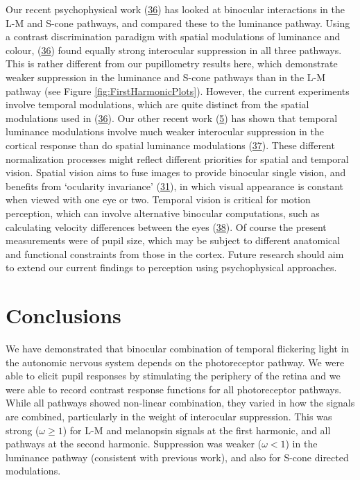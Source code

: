 \documentclass[
]{article}
\begin{document}
Our recent psychophysical work (\protect\hyperlink{ref-Baker2024}{36}) has looked at binocular interactions in the L-M and S-cone pathways, and compared these to the luminance pathway. Using a contrast discrimination paradigm with spatial modulations of luminance and colour, (\protect\hyperlink{ref-Baker2024}{36}) found equally strong interocular suppression in all three pathways. This is rather different from our pupillometry results here, which demonstrate weaker suppression in the luminance and S-cone pathways than in the L-M pathway (see Figure \ref{fig:FirstHarmonicPlots}). However, the current experiments involve temporal modulations, which are quite distinct from the spatial modulations used in (\protect\hyperlink{ref-Baker2024}{36}). Our other recent work (\protect\hyperlink{ref-Segala2023}{5}) has shown that temporal luminance modulations involve much weaker interocular suppression in the cortical response than do spatial luminance modulations (\protect\hyperlink{ref-Baker2017}{37}). These different normalization processes might reflect different priorities for spatial and temporal vision. Spatial vision aims to fuse images to provide binocular single vision, and benefits from `ocularity invariance' (\protect\hyperlink{ref-Baker2007}{31}), in which visual appearance is constant when viewed with one eye or two. Temporal vision is critical for motion perception, which can involve alternative binocular computations, such as calculating velocity differences between the eyes (\protect\hyperlink{ref-Kaestner2019}{38}). Of course the present measurements were of pupil size, which may be subject to different anatomical and functional constraints from those in the cortex. Future research should aim to extend our current findings to perception using psychophysical approaches.

\hypertarget{conclusions}{%
\section{Conclusions}\label{conclusions}}

We have demonstrated that binocular combination of temporal flickering light in the autonomic nervous system depends on the photoreceptor pathway. We were able to elicit pupil responses by stimulating the periphery of the retina and we were able to record contrast response functions for all photoreceptor pathways. While all pathways showed non-linear combination, they varied in how the signals are combined, particularly in the weight of interocular suppression. This was strong (\(\omega \ge 1\)) for L-M and melanopsin signals at the first harmonic, and all pathways at the second harmonic. Suppression was weaker (\(\omega < 1\)) in the luminance pathway (consistent with previous work), and also for S-cone directed modulations.
\end{document}
